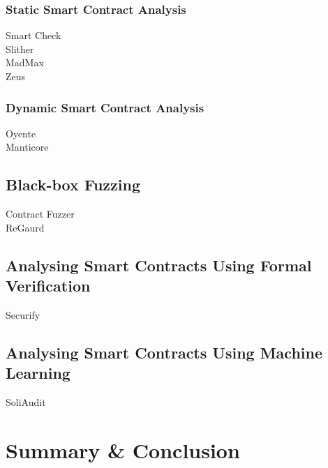 \documentclass[a4paper,11pt]{article}
\begin{document}
\subsubsection{Static Smart Contract Analysis}

Smart Check \cite{tikhomirov2018smartcheck} \\
Slither \cite{feist2019slither} \\
MadMax \cite{grech2018madmax} \\
Zeus \cite{kalra2018zeus} \\ 

\subsubsection{Dynamic Smart Contract Analysis}

Oyente \cite{luu2016making} \\
Manticore \cite{mossberg2019manticore} \\

\subsection{Black-box Fuzzing}

Contract Fuzzer \cite{jiang2018contractfuzzer} \\
ReGaurd \cite{liu2018reguard} \\

\subsection{Analysing Smart Contracts Using Formal Verification}

Securify \cite{tsankov2018securify} \\

\subsection{Analysing Smart Contracts Using Machine Learning}

SoliAudit \cite{liao2019soliaudit} \\

\section{Summary \& Conclusion}

\nocite{*}



\small

\end{document}
